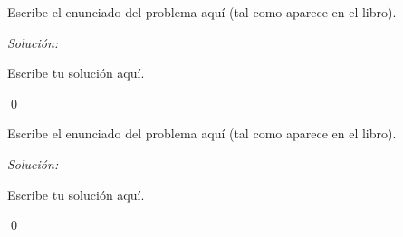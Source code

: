 \documentclass[12pt]{article}
\newenvironment{problema}[2][Problema]{\begin{trivlist}
		\item[\hskip \labelsep {\bfseries #1}\hskip \labelsep {\bfseries #2.}]}{\end{trivlist}}
\newenvironment{solucion}
{\emph{Soluci\'on:}
}
{
	\qed
}
\begin{document}
	
	\begin{problema}{x.y.z} 
		Escribe el enunciado del problema aquí (tal como aparece en el libro).
	\end{problema}
	\begin{solucion}
		Escribe tu solución aquí.
	\end{solucion}
	
	\begin{problema}{x.y.z}
		Escribe el enunciado del problema aquí (tal como aparece en el libro).
	\end{problema}
	\begin{solucion}
		Escribe tu solución aquí.
	\end{solucion}
		
\end{document}
